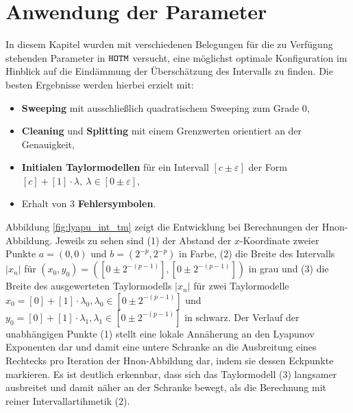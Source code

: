  \section{Anwendung der Parameter}
 In diesem Kapitel wurden mit verschiedenen Belegungen für die zu Verfügung stehenden Parameter in $\verb+HOTM+$ versucht, eine möglichst optimale Konfiguration im Hinblick auf die Eindämmung der Überschätzung des Intervalls zu finden. Die besten Ergebnisse werden hierbei erzielt mit: 
 \begin{itemize}
  \item \textbf{Sweeping} mit ausschließlich quadratischem Sweeping zum Grade 0,
  \item \textbf{Cleaning} und \textbf{Splitting} mit einem Grenzwerten orientiert an der Genauigkeit,
  \item \textbf{Initialen Taylormodellen} für ein Intervall $[c \pm \varepsilon]$ der Form $[c] + [1] \cdot \lambda,\  \lambda \in [0 \pm \varepsilon]$,
  \item Erhalt von 3 \textbf{Fehlersymbolen}.
 \end{itemize}
Abbildung \ref{fig:lyapu_int_tm} zeigt die Entwicklung bei Berechnungen der H\e non-Abbildung. Jeweils zu sehen sind (1) der Abstand der $x$-Koordinate zweier Punkte $a=(0,0)$ und $b=(2^{-p},2^{-p})$ in Farbe, (2) die Breite des Intervalls $|x_n|$ für $(x_0, y_0)=([0\pm 2^{-(p-1)}],[0\pm 2^{-(p-1)}])$ in grau und (3) die Breite des ausgewerteten Taylormodells $|x_n|$ für zwei Taylormodelle $x_0 = [0] + [1]\cdot \lambda_0, \lambda_0\in [0\pm 2^{-(p-1)}]$ und $y_0 = [0] + [1]\cdot \lambda_1, \lambda_1\in [0\pm 2^{-(p-1)}]$ in schwarz. Der Verlauf der unabhängigen Punkte (1) stellt eine lokale Annäherung an den Lyapunov Exponenten dar und damit eine untere Schranke an die Ausbreitung eines Rechtecks pro Iteration der H\e non-Abbildung dar, indem sie dessen Eckpunkte markieren. Es ist deutlich erkennbar, dass sich das Taylormodell (3) langsamer ausbreitet und damit näher an der Schranke bewegt, als die Berechnung mit reiner Intervallartihmetik (2).
 
 
 
